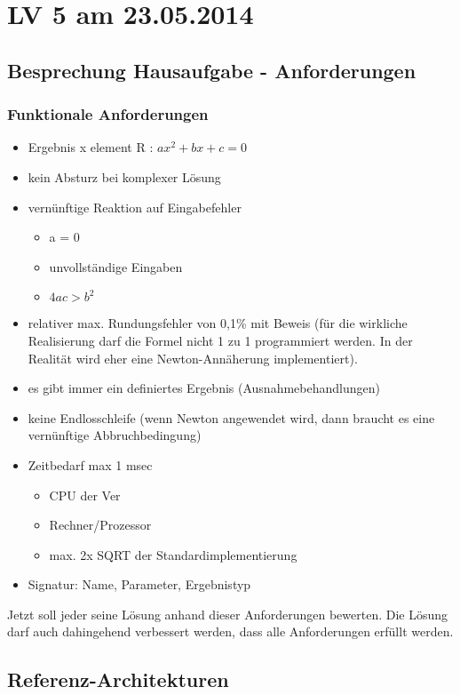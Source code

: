 \chapter{LV 5 am 23.05.2014}
\section{Besprechung Hausaufgabe - Anforderungen}
\subsection{Funktionale Anforderungen}
\begin{itemize}
\item Ergebnis x element R : $ax^2 + bx + c = 0$ %
\item kein Absturz bei komplexer Lösung
\item vernünftige Reaktion auf Eingabefehler
	\begin{itemize}
		\item a = 0
		\item unvollständige Eingaben
		\item $4ac > b^2$ %
	\end{itemize}
\item relativer max. Rundungsfehler von 0,1\% mit Beweis (für die wirkliche Realisierung darf die Formel nicht 1 zu 1 programmiert werden. In der Realität wird eher eine Newton-Annäherung implementiert).
\item es gibt immer ein definiertes Ergebnis (Ausnahmebehandlungen)
\item keine Endlosschleife (wenn Newton angewendet wird, dann braucht es eine vernünftige Abbruchbedingung)
\item Zeitbedarf max 1 msec
	\begin{itemize}
		\item CPU der Ver
		\item Rechner/Prozessor
		\item max. 2x SQRT der Standardimplementierung
	\end{itemize}
\item Signatur: Name, Parameter, Ergebnistyp
\end{itemize}

Jetzt soll jeder seine Lösung anhand dieser Anforderungen bewerten. Die Lösung darf auch dahingehend verbessert werden, dass alle Anforderungen erfüllt werden.

\section{Referenz-Architekturen}

